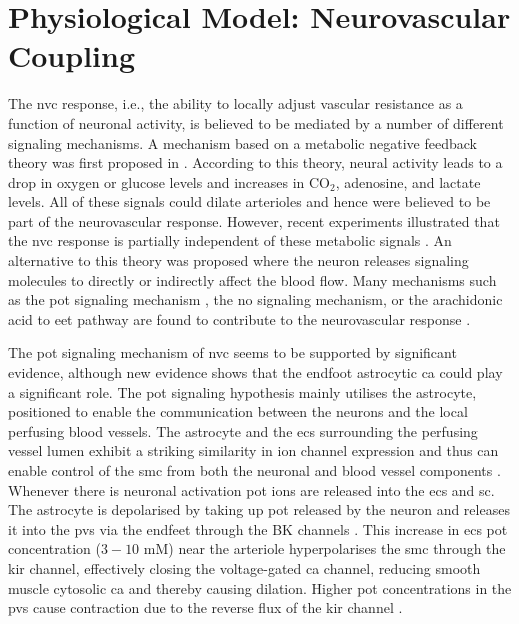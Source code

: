 \section{Physiological Model: Neurovascular Coupling}\label{sec:model}
The \gls{nvc} response, i.e., the ability to locally adjust vascular resistance as a function of neuronal activity, is believed to be mediated by a number of different signaling mechanisms. A  mechanism based on a metabolic negative feedback theory was first proposed in \cite{Roy1890}. According to this theory, neural activity leads to a drop in oxygen or glucose levels and increases in CO$_2$, adenosine, and lactate levels. All of these signals could dilate arterioles and hence were believed to be part of the neurovascular response. However, recent experiments illustrated that the \gls{nvc} response is partially independent of these metabolic signals \cite{Leithner2010, Lindauer2010, Mintun2001, Powers1996, Makani2010}. An alternative to this theory was proposed where the neuron releases signaling molecules to directly or indirectly affect the blood flow. Many mechanisms such as the \gls{pot} signaling mechanism \cite{Filosa2006}, the \gls{no} signaling mechanism, or the arachidonic acid to \gls{eet} pathway are found to contribute to the neurovascular response \cite{Attwell2010}.

The \gls{pot} signaling mechanism of \gls{nvc} seems to be supported by significant evidence, although new evidence shows that the endfoot astrocytic \gls{ca} could play a significant role. The \gls{pot} signaling hypothesis mainly utilises the astrocyte,  positioned to enable the communication between the neurons and the local perfusing blood vessels. The astrocyte and the \glspl{ec} surrounding the perfusing vessel lumen exhibit a striking similarity in ion channel expression and thus can enable control of the \gls{smc} from both the neuronal and blood vessel components \cite{Longden2015}. Whenever there is neuronal activation \gls{pot} ions are released into the \gls{ecs} and \gls{sc}. The astrocyte is depolarised by taking up \gls{pot} released by the neuron and releases it into the \gls{pvs} via the endfeet through the BK channels \citep{Filosa2007}. This increase in \gls{ecs} \gls{pot} concentration ($3-10$ mM) near the arteriole hyperpolarises the \gls{smc} through the \gls{kir} channel, effectively closing the voltage-gated \gls{ca} channel, reducing smooth muscle cytosolic \gls{ca} and thereby causing dilation. Higher \gls{pot} concentrations in the \gls{pvs} cause contraction due to the reverse flux of the \gls{kir} channel \citep{Farr2011}. 


